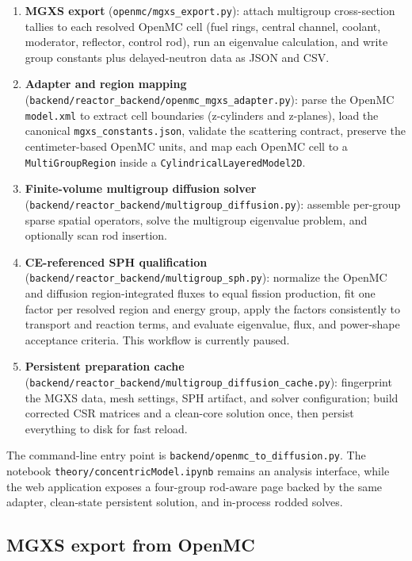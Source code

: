 \documentclass[11pt]{article}
\begin{document}
\begin{enumerate}
  \item \textbf{MGXS export} (\texttt{openmc/mgxs\_export.py}):
        attach multigroup cross-section tallies to each resolved OpenMC cell
        (fuel rings, central channel, coolant, moderator, reflector, control
        rod), run an eigenvalue calculation, and write group constants plus
        delayed-neutron data as JSON and CSV.
  \item \textbf{Adapter and region mapping}
        (\texttt{backend/reactor\_backend/openmc\_mgxs\_adapter.py}):
        parse the OpenMC \texttt{model.xml} to extract cell boundaries
        (z-cylinders and z-planes), load the canonical
        \texttt{mgxs\_constants.json}, validate the scattering contract,
        preserve the centimeter-based OpenMC units, and map each OpenMC cell to a
        \texttt{MultiGroupRegion} inside a \texttt{CylindricalLayeredModel2D}.
  \item \textbf{Finite-volume multigroup diffusion solver}
        (\texttt{backend/reactor\_backend/multigroup\_diffusion.py}):
        assemble per-group sparse spatial operators, solve the multigroup
        eigenvalue problem, and optionally scan rod insertion.
  \item \textbf{CE-referenced SPH qualification}
        (\texttt{backend/reactor\_backend/multigroup\_sph.py}):
        normalize the OpenMC and diffusion region-integrated fluxes to equal
        fission production, fit one factor per resolved region and energy
        group, apply the factors consistently to transport and reaction terms,
        and evaluate eigenvalue, flux, and power-shape acceptance criteria.
        This workflow is currently paused.
  \item \textbf{Persistent preparation cache}
        (\texttt{backend/reactor\_backend/multigroup\_diffusion\_cache.py}):
        fingerprint the MGXS data, mesh settings, SPH artifact, and solver
        configuration; build corrected CSR matrices and a clean-core solution
        once, then persist everything to disk for fast reload.
\end{enumerate}

The command-line entry point is
\texttt{backend/openmc\_to\_diffusion.py}.  The notebook
\texttt{theory/concentricModel.ipynb} remains an analysis interface, while the
web application exposes a four-group rod-aware page backed by the same adapter,
clean-state persistent solution, and in-process rodded solves.

\subsection{MGXS export from OpenMC}
\end{document}
